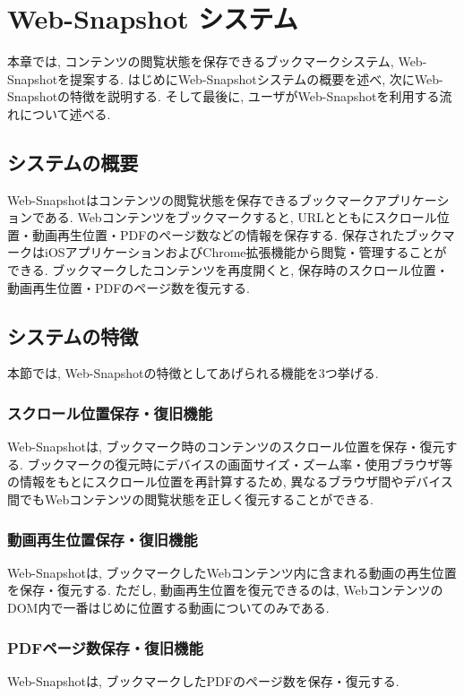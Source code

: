 \chapter{Web-Snapshot システム}
\label{chap:web_snapshot_system}
本章では, コンテンツの閲覧状態を保存できるブックマークシステム, Web-Snapshotを提案する.
はじめにWeb-Snapshotシステムの概要を述べ, 次にWeb-Snapshotの特徴を説明する.
そして最後に, ユーザがWeb-Snapshotを利用する流れについて述べる.

\section{システムの概要}
Web-Snapshotはコンテンツの閲覧状態を保存できるブックマークアプリケーションである.
Webコンテンツをブックマークすると, URLとともにスクロール位置・動画再生位置・PDFのページ数などの情報を保存する.
保存されたブックマークはiOSアプリケーションおよびChrome拡張機能から閲覧・管理することができる.
ブックマークしたコンテンツを再度開くと, 保存時のスクロール位置・動画再生位置・PDFのページ数を復元する.

\section{システムの特徴}
本節では, Web-Snapshotの特徴としてあげられる機能を3つ挙げる.

\subsection{スクロール位置保存・復旧機能}
Web-Snapshotは, ブックマーク時のコンテンツのスクロール位置を保存・復元する.
ブックマークの復元時にデバイスの画面サイズ・ズーム率・使用ブラウザ等の情報をもとにスクロール位置を再計算するため, 異なるブラウザ間やデバイス間でもWebコンテンツの閲覧状態を正しく復元することができる.

\subsection{動画再生位置保存・復旧機能}
Web-Snapshotは, ブックマークしたWebコンテンツ内に含まれる動画の再生位置を保存・復元する.
ただし, 動画再生位置を復元できるのは, WebコンテンツのDOM内で一番はじめに位置する動画についてのみである.

\subsection{PDFページ数保存・復旧機能}
Web-Snapshotは, ブックマークしたPDFのページ数を保存・復元する.

